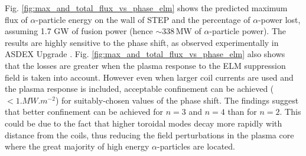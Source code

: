 \documentclass[10pt, a4paper, twoside]{article}
\begin{document}
Fig. \ref{fig:max_and_total_flux_vs_phase_elm} shows the predicted maximum flux of $\alpha$-particle energy on the wall of STEP and the percentage of $\alpha$-power lost, assuming 1.7 GW of fusion power (hence $\sim 338\,$MW of $\alpha$-particle power). The results are highly sensitive to the phase shift, as observed experimentally in ASDEX Upgrade \cite{sanchis2018}. Fig. \ref{fig:max_and_total_flux_vs_phase_elm} also shows that the losses are greater when the plasma response to the ELM suppression field is taken into account. However even when larger coil currents are used and the plasma response is included, acceptable confinement can be achieved ($<1\si{.MW.m^{-2}}$) for suitably-chosen values of the phase shift. The findings suggest that better confinement can be achieved for $n=3$ and $n=4$ than for $n=2$. This could be due to the fact that higher toroidal modes decay more rapidly with distance from the coils, thus reducing the field perturbations in the plasma core where the great majority of high energy $\alpha$-particles are located.
\end{document}
